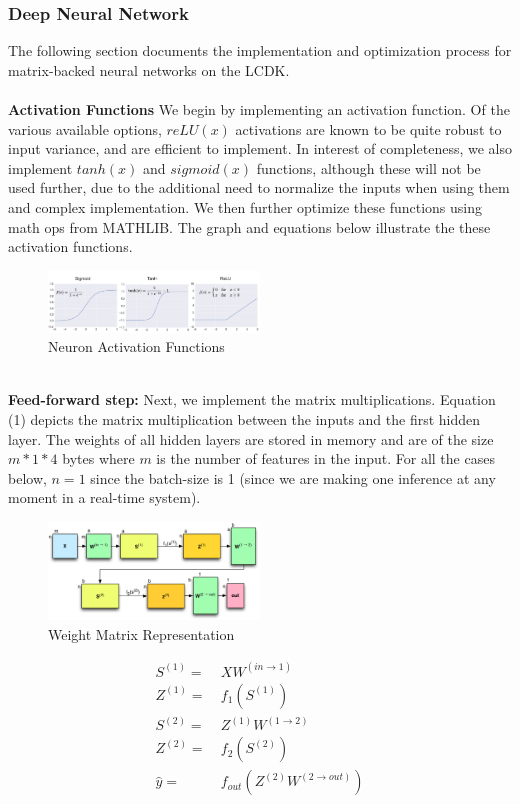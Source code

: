 \subsubsection{Deep Neural Network}
The following section documents the implementation and optimization process for matrix-backed neural networks on the LCDK.\\
\\\textbf{Activation Functions} We begin by implementing an activation function. Of the various available options, $reLU(x)$ activations are known to be quite robust to input variance, and are efficient to implement. In interest of completeness, we also implement $tanh(x)$ and $sigmoid(x)$ functions, although these will not be used further, due to the additional need to normalize the inputs when using them and complex implementation. We then further optimize these functions using math ops from MATHLIB. The graph and equations below illustrate the these activation functions.
\begin{figure}[h!]
  \caption{Neuron Activation Functions}
  \includegraphics[width=0.5\textwidth]{images/activation.png}
\end{figure}
\\\textbf{Feed-forward step:} Next, we implement the matrix multiplications. Equation (1) depicts the matrix multiplication between the inputs and the first hidden layer. The weights of all hidden layers are stored in memory and are of the size $m*1*4$ bytes where $m$ is the number of features in the input. For all the cases below, $n=1$ since the batch-size is 1 (since we are making one inference at any moment in a real-time system).
\begin{figure}[h!]
  \caption{Weight Matrix Representation}
  \includegraphics[width=0.5\textwidth]{images/matrix.png}
\end{figure}
\begin{align}
  S^{(1)} =&\ XW^{(in\rightarrow 1)}\\
  Z^{(1)} =&\ f_1(S^{(1)})\\
  S^{(2)} =&\ Z^{(1)}W^{(1\rightarrow 2)}\\
  Z^{(2)} =&\ f_2(S^{(2)})\\
  \hat{y} =&\ f_{out}\left(Z^{(2)}W^{(2\rightarrow out)}\right)
\end{align}

